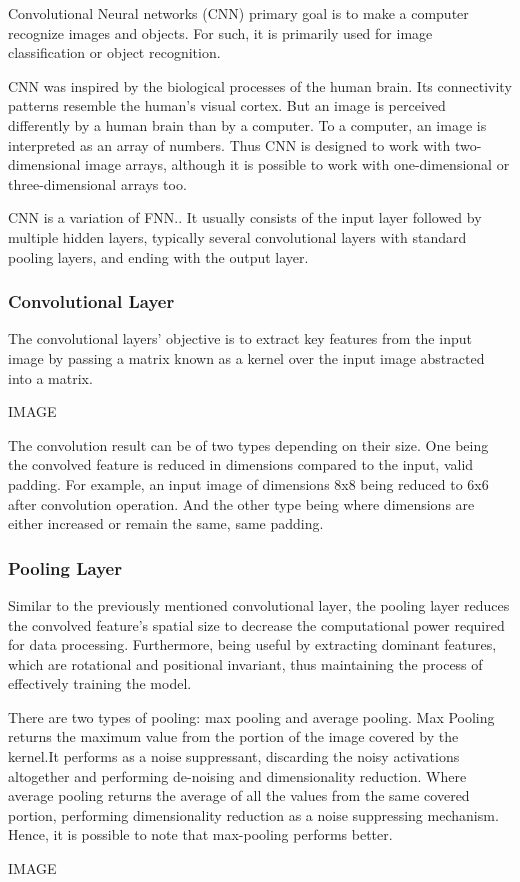 Convolutional Neural networks (CNN) primary goal is to make a computer recognize images and objects. For such, it is primarily used for image classification or object recognition.

CNN was inspired by the biological processes of the human brain. Its connectivity patterns resemble the human's visual cortex. But an image is perceived differently by a human brain than by a computer. To a computer, an image is interpreted as an array of numbers. Thus CNN is designed to work with two-dimensional image arrays, although it is possible to work with one-dimensional or three-dimensional arrays too.\cite{mlmastery}

CNN is a variation of FNN.\cite{Goodfellow-et-al-2016}. It usually consists of the input layer followed by multiple hidden layers, typically several convolutional layers with standard pooling layers, and ending with the output layer. 

\subsubsection{Convolutional Layer}

The convolutional layers' objective is to extract key features from the input image by passing a matrix known as a kernel over the input image abstracted into a matrix.\cite{mathworkscnn}

IMAGE

The convolution result can be of two types depending on their size. One being the convolved feature is reduced in dimensions compared to the input, valid padding. For example, an input image of dimensions 8x8 being reduced to 6x6 after convolution operation. And the other type being where dimensions are either increased or remain the same, same padding. \cite{compguideCnn}

\subsubsection{Pooling Layer}


Similar to the previously mentioned convolutional layer, the pooling layer reduces the convolved feature's spatial size to decrease the computational power required for data processing. Furthermore, being useful by extracting dominant features, which are rotational and positional invariant, thus maintaining the process of effectively training the model.\cite{compguideCnn}

There are two types of pooling: max pooling and average pooling. Max Pooling returns the maximum value from the portion of the image covered by the kernel.It performs as a noise suppressant, discarding the noisy activations altogether and performing de-noising and dimensionality reduction. Where average pooling returns the average of all the values from the same covered portion, performing dimensionality reduction as a noise suppressing mechanism. Hence, it is possible to note that max-pooling performs better.\cite{compguideCnn}

IMAGE